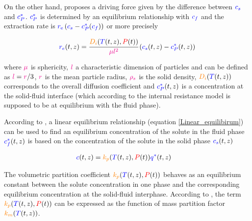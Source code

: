 \documentclass[../Article_Model_Parameters.tex]{subfiles}
\begin{document}
		On the other hand, \citet{Reverchon1996} proposes a driving force given by the difference between ${\color{blue}c_s}$ and ${\color{blue}c_P^*}$. ${\color{blue}c_P^*}$ is determined by an equilibrium relationship with ${\color{blue}c_f}$ and the extraction rate is ${\color{blue}r_\text{e}}\left({\color{blue}c_s} - {\color{blue}c^*_P}({\color{blue}c_f})\right)$ or more precisely
			
			{\footnotesize
				\begin{equation} \label{Model_kinetic_basic}
					{\color{blue}r_e}(t,z) = \cfrac{{\color{orange}D_i}({\color{blue}T}(t,z), {\color{red}P}(t))}{{\color{magenta} \mu l^2} }\left({\color{blue}c_s}(t,z) - {\color{blue}c_P^*}(t,z) \right)
			\end{equation} }
			
		where ${\color{magenta}\mu}$ is sphericity, ${\color{magenta}l}$ a characteristic dimension of particles and can be defined as ${\color{magenta}l} = {\color{magenta}r}/3$, ${\color{magenta}r}$ is the mean particle radius, ${\color{magenta}\rho_s}$ is the solid density, ${\color{orange}D_i}({\color{blue}T}(t,z))$ corresponds to the overall diffusion coefficient and ${\color{blue}c_P^*}(t,z)$ is a concentration at the solid-fluid interface (which according to the internal resistance model is supposed to be at equilibrium with the fluid phase). 
			
		According to \citet{Bulley1984}, a linear equilibrium relationship (equation  \ref{Linear_equilibirum}) can be used to find an equilibrium concentration of the solute in the fluid phase ${\color{blue}c_f^*}(t,z)$ is based on the concentration of the solute in the solid phase ${\color{blue}c_s}(t,z)$ 
			
			{\footnotesize
				\begin{align} \label{Linear_equilibirum}
					{\color{blue}c}(t,z) &= {\color{orange}k_p}({\color{blue}T}(t,z),{\color{red}P}(t)) \allowbreak {\color{blue}q^*}(t,z)
			\end{align} }
			
			The volumetric partition coefficient ${\color{orange}k_p}({\color{blue}T}(t,z),{\color{red}P}(t))$ behaves as an equilibrium constant between the solute concentration in one phase and the corresponding equilibrium concentration at the solid-fluid interphase. According to \citet{Spiro2007}, the term ${\color{orange}k_p}({\color{blue}T}(t,z),{\color{red}P}(t))$ can be expressed as the function of mass partition factor ${\color{orange}k_m}({\color{blue}T}(t,z))$.
			
\end{document}
